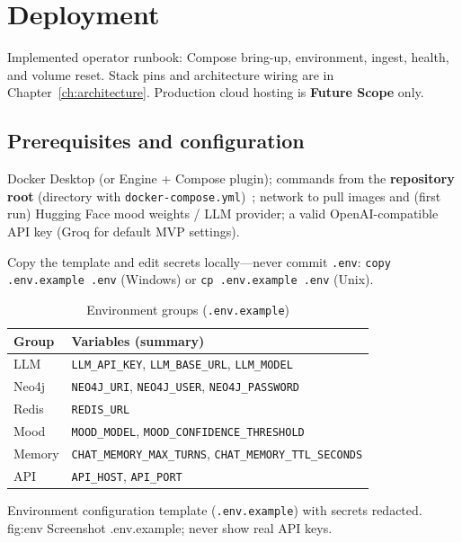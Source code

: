 \chapter{Deployment}
\label{ch:deployment}

Implemented operator runbook: Compose bring-up, environment, ingest, health, and volume reset. Stack pins and architecture wiring are in Chapter~\ref{ch:architecture}. Production cloud hosting is \textbf{Future Scope} only.

\section{Prerequisites and configuration}

Docker Desktop (or Engine + Compose plugin); commands from the \textbf{repository root} (directory with \texttt{docker-compose.yml})~\cite{readme}; network to pull images and (first run) Hugging Face mood weights / LLM provider; a valid OpenAI-compatible API key (Groq for default MVP settings).

Copy the template and edit secrets locally---never commit \texttt{.env}: \texttt{copy .env.example .env} (Windows) or \texttt{cp .env.example .env} (Unix).

\begin{table}[!htbp]
\centering
\small
\caption{Environment groups (\texttt{.env.example})}
\label{tab:env-groups}
\begin{tabularx}{\textwidth}{@{}
  >{\raggedright\arraybackslash}p{}
  >{\raggedright\arraybackslash}X
  @{}}
\toprule
\textbf{Group} & \textbf{Variables (summary)} \\
\midrule
LLM & \texttt{LLM\_API\_KEY}, \texttt{LLM\_BASE\_URL}, \texttt{LLM\_MODEL} \\
\addlinespace
Neo4j & \texttt{NEO4J\_URI}, \texttt{NEO4J\_USER}, \texttt{NEO4J\_PASSWORD} \\
\addlinespace
Redis & \texttt{REDIS\_URL} \\
\addlinespace
Mood & \texttt{MOOD\_MODEL}, \texttt{MOOD\_CONFIDENCE\_THRESHOLD} \\
\addlinespace
Memory & \texttt{CHAT\_MEMORY\_MAX\_TURNS}, \texttt{CHAT\_MEMORY\_TTL\_SECONDS} \\
\addlinespace
API & \texttt{API\_HOST}, \texttt{API\_PORT} \\
\bottomrule
\end{tabularx}
\end{table}

%
{Environment configuration template (\texttt{.env.example}) with secrets redacted.}%
{fig:env}%
{Screenshot .env.example; never show real API keys.}

